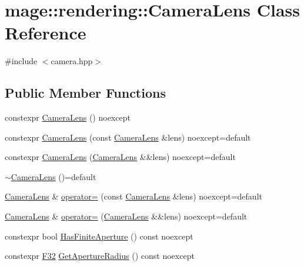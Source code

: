 \hypertarget{classmage_1_1rendering_1_1_camera_lens}{}\section{mage\+:\+:rendering\+:\+:Camera\+Lens Class Reference}
\label{classmage_1_1rendering_1_1_camera_lens}


{\ttfamily \#include $<$camera.\+hpp$>$}

\subsection*{Public Member Functions}
\begin{DoxyCompactItemize}
\item 
constexpr \mbox{\hyperlink{classmage_1_1rendering_1_1_camera_lens_aa17be03069e7150aaaaa12cd2bd161fc}{Camera\+Lens}} () noexcept
\item 
constexpr \mbox{\hyperlink{classmage_1_1rendering_1_1_camera_lens_a69c6788001ad02b1ee229d530ded8fe0}{Camera\+Lens}} (const \mbox{\hyperlink{classmage_1_1rendering_1_1_camera_lens}{Camera\+Lens}} \&lens) noexcept=default
\item 
constexpr \mbox{\hyperlink{classmage_1_1rendering_1_1_camera_lens_a59311c60fc8625a38c04edbb97e23179}{Camera\+Lens}} (\mbox{\hyperlink{classmage_1_1rendering_1_1_camera_lens}{Camera\+Lens}} \&\&lens) noexcept=default
\item 
\mbox{\hyperlink{classmage_1_1rendering_1_1_camera_lens_ad01ffa0adfbdb43e2cf1ed6cbb80092a}{$\sim$\+Camera\+Lens}} ()=default
\item 
\mbox{\hyperlink{classmage_1_1rendering_1_1_camera_lens}{Camera\+Lens}} \& \mbox{\hyperlink{classmage_1_1rendering_1_1_camera_lens_a1b61b2f225578e1a71d5e3101cd1b0ec}{operator=}} (const \mbox{\hyperlink{classmage_1_1rendering_1_1_camera_lens}{Camera\+Lens}} \&lens) noexcept=default
\item 
\mbox{\hyperlink{classmage_1_1rendering_1_1_camera_lens}{Camera\+Lens}} \& \mbox{\hyperlink{classmage_1_1rendering_1_1_camera_lens_a09ce42a5b033def0baec29b7ac9483d2}{operator=}} (\mbox{\hyperlink{classmage_1_1rendering_1_1_camera_lens}{Camera\+Lens}} \&\&lens) noexcept=default
\item 
constexpr bool \mbox{\hyperlink{classmage_1_1rendering_1_1_camera_lens_a09a7cc18ca89da0c177c4f7dc0bbcc41}{Has\+Finite\+Aperture}} () const noexcept
\item 
constexpr \mbox{\hyperlink{namespacemage_aa97e833b45f06d60a0a9c4fc22ae02c0}{F32}} \mbox{\hyperlink{classmage_1_1rendering_1_1_camera_lens_a41d6a7033de1bfa0335405c36b9d528c}{Get\+Aperture\+Radius}} () const noexcept

\end{DoxyCompactItemize}
